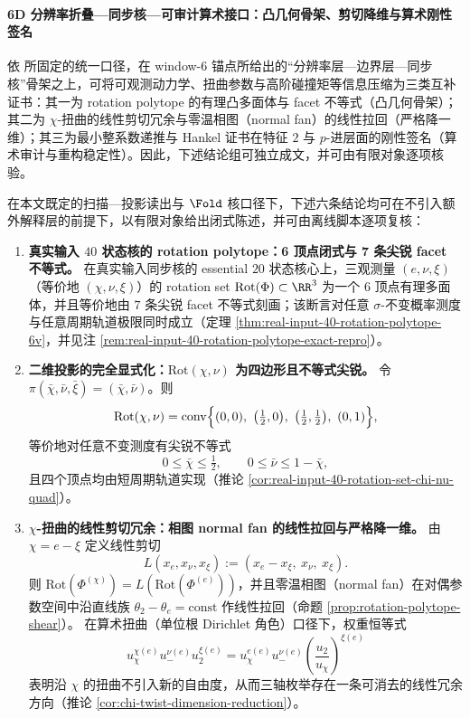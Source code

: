 \paragraph{6D 分辨率折叠—同步核—可审计算术接口：凸几何骨架、剪切降维与算术刚性签名}
依 \cite{Internal2026POMGenerativeAddressThreeRegisterBridgeRH} 所固定的统一口径，在 window-\(6\) 锚点所给出的“分辨率层—边界层—同步核”骨架之上，可将可观测动力学、扭曲参数与高阶碰撞矩等信息压缩为三类互补证书：其一为 rotation polytope 的有理凸多面体与 facet 不等式（凸几何骨架）；其二为 \(\chi\)-扭曲的线性剪切冗余与零温相图（normal fan）的线性拉回（严格降一维）；其三为最小整系数递推与 Hankel 证书在特征 \(2\) 与 \(p\)-进层面的刚性签名（算术审计与重构稳定性）。因此，下述结论组可独立成文，并可由有限对象逐项核验。

\begin{theorem}\label{thm:tri-interface-discrete-convex-arithmetic}
在本文既定的扫描—投影读出与 \(\Fold\) 核口径下，下述六条结论均可在不引入额外解释层的前提下，以有限对象给出闭式陈述，并可由离线脚本逐项复核：
\begin{enumerate}
  \item \textbf{真实输入 \(40\) 状态核的 rotation polytope：6 顶点闭式与 7 条尖锐 facet 不等式。}
  在真实输入同步核的 essential \(20\) 状态核心上，三观测量 \((e,\nu,\xi)\)（等价地 \((\chi,\nu,\xi)\)）的 rotation set \(\mathrm{Rot}(\Phi)\subset\RR^3\) 为一个 \(6\) 顶点有理多面体，并且等价地由 \(7\) 条尖锐 facet 不等式刻画；该断言对任意 \(\sigma\)-不变概率测度与任意周期轨道极限同时成立（定理 \ref{thm:real-input-40-rotation-polytope-6v}，并见注 \ref{rem:real-input-40-rotation-polytope-exact-repro}）。

  \item \textbf{二维投影的完全显式化：\(\mathrm{Rot}(\chi,\nu)\) 为四边形且不等式尖锐。}
  令 \(\pi(\bar\chi,\bar\nu,\bar\xi)=(\bar\chi,\bar\nu)\)。则
  \[
  \mathrm{Rot}(\chi,\nu)
  =\mathrm{conv}\Bigl\{(0,0),\ \bigl(\tfrac12,0\bigr),\ \bigl(\tfrac12,\tfrac12\bigr),\ (0,1)\Bigr\},
  \]
  等价地对任意不变测度有尖锐不等式
  \[
  0\le \bar\chi\le\tfrac12,
  \qquad
  0\le \bar\nu\le 1-\bar\chi,
  \]
  且四个顶点均由短周期轨道实现（推论 \ref{cor:real-input-40-rotation-set-chi-nu-quad}）。

  \item \textbf{\(\chi\)-扭曲的线性剪切冗余：相图 normal fan 的线性拉回与严格降一维。}
  由 \(\chi=e-\xi\) 定义线性剪切
  \[
  L(x_e,x_\nu,x_\xi):=(x_e-x_\xi,\ x_\nu,\ x_\xi).
  \]
  则
  \(
  \mathrm{Rot}(\Phi^{(\chi)})=L(\mathrm{Rot}(\Phi^{(e)}))
  \)，并且零温相图（normal fan）在对偶参数空间中沿直线族 \(\theta_2-\theta_e=\mathrm{const}\) 作线性拉回（命题 \ref{prop:rotation-polytope-shear}）。
  在算术扭曲（单位根 Dirichlet 角色）口径下，权重恒等式
  \[
  u_\chi^{\chi(e)}u_-^{\nu(e)}u_2^{\xi(e)}
  =u_\chi^{e(e)}u_-^{\nu(e)}\left(\frac{u_2}{u_\chi}\right)^{\xi(e)}
  \]
  表明沿 \(\chi\) 的扭曲不引入新的自由度，从而三轴枚举存在一条可消去的线性冗余方向（推论 \ref{cor:chi-twist-dimension-reduction}）。


\end{enumerate}
\end{theorem}

